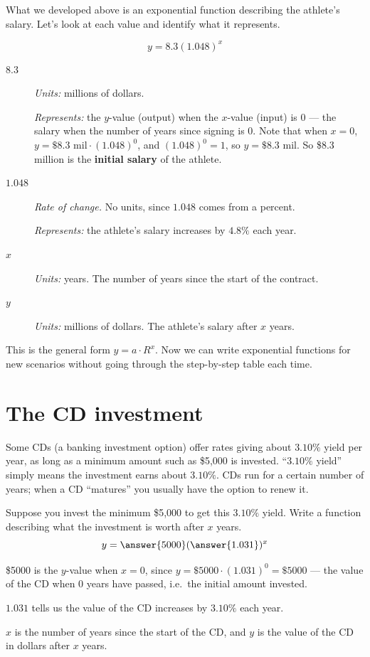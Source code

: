 \documentclass[12pt]{ximera}
\begin{document}
What we developed above is an exponential function describing the athlete's salary.
Let's look at each value and identify what it represents.

\[
y = 8.3(1.048)^{x}
\]

\begin{description}
\item[$8.3$] \emph{Units:} millions of dollars.

  \emph{Represents:} the $y$-value (output) when the $x$-value (input) is $0$ ---
  the salary when the number of years since signing is $0$. Note that when $x = 0$,
  $y = \$8.3 \text{ mil} \cdot (1.048)^0$, and $(1.048)^0 = 1$, so
  $y = \$8.3$ mil. So \$8.3 million is the \textbf{initial salary} of the athlete.

\item[$1.048$] \emph{Rate of change.} No units, since $1.048$ comes from a percent.

  \emph{Represents:} the athlete's salary increases by $4.8\%$ each year.

\item[$x$] \emph{Units:} years. The number of years since the start of the contract.

\item[$y$] \emph{Units:} millions of dollars. The athlete's salary after $x$ years.
\end{description}

This is the general form $y = a \cdot R^{x}$. Now we can write exponential functions
for new scenarios without going through the step-by-step table each time.

\section*{The CD investment}

Some CDs (a banking investment option) offer rates giving about $3.10\%$ yield per
year, as long as a minimum amount such as \$5,000 is invested. ``$3.10\%$ yield''
simply means the investment earns about $3.10\%$. CDs run for a certain number of
years; when a CD ``matures'' you usually have the option to renew it.

\begin{problem}
Suppose you invest the minimum \$5,000 to get this $3.10\%$ yield. Write a function
describing what the investment is worth after $x$ years.
\[
y = \answer{5000}(\answer{1.031})^{x}
\]

\begin{solution}
\$5000 is the $y$-value when $x = 0$, since $y = \$5000 \cdot (1.031)^0 = \$5000$ ---
the value of the CD when 0 years have passed, i.e.\ the initial amount invested.

$1.031$ tells us the value of the CD increases by $3.10\%$ each year.

$x$ is the number of years since the start of the CD, and $y$ is the value of the CD
in dollars after $x$ years.
\end{solution}
\end{problem}
\end{document}
